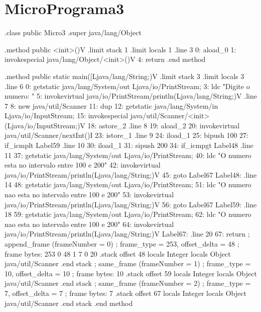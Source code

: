 \documentclass[12pt,a4paper,twoside]{report}
\begin{document}
\section{MicroPrograma3}
\begin{terminal}
.class public Micro3
.super java/lang/Object

.method public <init>()V
  .limit stack 1
  .limit locals 1
  .line 3
  0: aload_0
  1: invokespecial java/lang/Object/<init>()V
  4: return
.end method

.method public static main([Ljava/lang/String;)V
  .limit stack 3
  .limit locals 3
  .line 6
  0: getstatic java/lang/System/out Ljava/io/PrintStream;
  3: ldc "Digite o numero: "
  5: invokevirtual java/io/PrintStream/println(Ljava/lang/String;)V
  .line 7
  8: new java/util/Scanner
  11: dup
  12: getstatic java/lang/System/in Ljava/io/InputStream;
  15: invokespecial java/util/Scanner/<init>(Ljava/io/InputStream;)V
  18: astore_2
  .line 8
  19: aload_2
  20: invokevirtual java/util/Scanner/nextInt()I
  23: istore_1
  .line 9
  24: iload_1
  25: bipush 100
  27: if_icmplt Label59
  .line 10
  30: iload_1
  31: sipush 200
  34: if_icmpgt Label48
  .line 11
  37: getstatic java/lang/System/out Ljava/io/PrintStream;
  40: ldc "O numero esta no intervalo entre 100 e 200"
  42: invokevirtual java/io/PrintStream/println(Ljava/lang/String;)V
  45: goto Label67
Label48:
  .line 14
  48: getstatic java/lang/System/out Ljava/io/PrintStream;
  51: ldc "O numero nao esta no intervalo entre 100 e 200"
  53: invokevirtual java/io/PrintStream/println(Ljava/lang/String;)V
  56: goto Label67
Label59:
  .line 18
  59: getstatic java/lang/System/out Ljava/io/PrintStream;
  62: ldc "O numero nao esta no intervalo entre 100 e 200"
  64: invokevirtual java/io/PrintStream/println(Ljava/lang/String;)V
Label67:
  .line 20
  67: return
  ; append_frame (frameNumber = 0)
  ; frame_type = 253, offset_delta = 48
  ; frame bytes: 253 0 48 1 7 0 20
  .stack
    offset 48
    locals Integer
    locals Object java/util/Scanner
    .end stack
  ; same_frame (frameNumber = 1)
  ; frame_type = 10, offset_delta = 10
  ; frame bytes: 10
  .stack
    offset 59
    locals Integer
    locals Object java/util/Scanner
    .end stack
  ; same_frame (frameNumber = 2)
  ; frame_type = 7, offset_delta = 7
  ; frame bytes: 7
  .stack
    offset 67
    locals Integer
    locals Object java/util/Scanner
    .end stack
.end method

\end{terminal}
\end{document}
